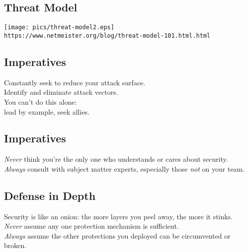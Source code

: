 \documentclass[xga]{xdvislides}
\begin{document}
\subsection{Threat Model}
\vspace*{\fill}
\begin{center}
	\texttt{[image: pics/threat-model2.eps]} \\
\vspace{.2in}
\small
	\verb+https://www.netmeister.org/blog/threat-model-101.html.html+
\end{center}
\Normalsize
\vspace*{\fill}



\subsection{Imperatives}
\vspace*{\fill}
\Huge
\begin{center}
Constantly seek to reduce your attack surface. \\
Identify and eliminate attack vectors.\\

\addvspace{.5in}
You can't do this alone:\\
lead by example, seek allies.
\end{center}
\Normalsize
\vspace*{\fill}

\subsection{Imperatives}
\vspace*{\fill}
\Huge
\begin{center}
{\em Never} think you're the only one who understands
or cares about security. \\

\addvspace{.5in}
{\em Always} consult with subject matter experts,
especially those {\em not} on your team.
\end{center}
\Normalsize
\vspace*{\fill}

\subsection{Defense in Depth}
\vspace*{\fill}
\Huge
\begin{center}
	Security is like an onion:
	the more layers you peel away, the more it stinks. \\
\addvspace{.5in}
\Normalsize
{\em Never} assume any one protection mechanism is sufficient. \\
\addvspace{.25in}
{\em Always} assume the other protections you deployed
can be circumvented or broken.
\end{center}
\vspace*{\fill}
\end{document}
